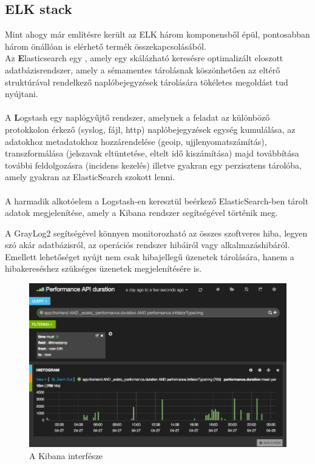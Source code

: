 \subsection{ELK stack}
Mint ahogy már említésre került az ELK három komponensből épül, pontosabban három önállóan is elérhető termék összekapcsolásából.\\
Az \textbf{E}lasticsearch egy , amely egy skálázható keresésre optimalizált eloszott adatbázisrendszer, amely a sémamentes tárolásnak köszönhetően az eltérő struktúrával rendelkező naplóbejegyzések tárolására tökéletes megoldást tud nyújtani.\\
\hfill\\
A \textbf{L}ogstash egy naplógyűjtő rendszer, amelynek a feladat az különböző protokkolon érkező (syslog, fájl, http) naplóbejegyzések egység kumulálása, az adatokhoz metadatokhoz hozzárendelése (geoip, ujjlenyomatszámítás), transzformálása (jelszavak eltüntetése, eltelt idő kiszámítása) majd továbbítása további feldolgozásra (incidens kezelés) illetve gyakran egy perzisztens tárolóba, amely gyakran az ElasticSearch szokott lenni.\\
\hfill\\
A harmadik alkotóelem a Logstash-en keresztül beérkező ElasticSearch-ben tárolt adatok megjelenítése, amely a Kibana rendszer segítségével történik meg.

A GrayLog2 segítségével könnyen monitorozható az összes szoftveres hiba, legyen szó akár adatbázisról, az operációs rendszer hibáiról vagy alkalmazáshibáról. Emellett lehetőséget nyújt nem csak hibajellegű üzenetek tárolására, hanem a hibakereséshez szükséges üzenetek megjelenítésére is.

\begin{figure}[ht]
	\centering
		\includegraphics[scale=0.5]{assets/elk.png}%
		\caption[DUMMY]%
		{A Kibana interfésze}%
		\label{fig:kibana-webinterface}
\end{figure}

